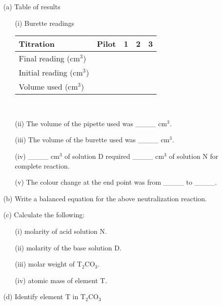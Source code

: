 \begin{enumerate}
\begin{enumerate}
\item[(a)] Table of results\\
\vspace{-10pt}
\begin{enumerate}
\item[(i)] Burette readings\\
\begin{center}
\begin{tabular}{|l|p{2cm}|p{2cm}|p{2cm}|p{2cm}|} \hline
\textbf{Titration}&\multicolumn{1}{|c|}{\textbf{Pilot}}&\multicolumn{1}{|c|}{\textbf{1}}&\multicolumn{1}{|c|}{\textbf{2}}&\multicolumn{1}{|c|}{\textbf{3}}\\ \hline
Final reading (cm$^3$)&&&&\\ \hline
Initial reading (cm$^3$)&&&&\\ \hline
Volume used (cm$^3$)&&&&\\ \hline
\end{tabular}\\
\end{center}
\vspace{4pt}
\item[(ii)] The volume of the pipette used was \_\_\_\_ cm$^3$.
\vspace{2pt}
\item[(iii)] The volume of the burette used was \_\_\_\_ cm$^3$.
\vspace{2pt}
\item[(iv)] \_\_\_\_ cm$^3$ of solution D required \_\_\_\_ cm$^3$ of solution N for complete reaction.\\
\vspace{-8pt}
\item[(v)] The colour change at the end point was from \_\_\_\_ to \_\_\_\_.\\
\end{enumerate}
\vspace{-10pt}
\item[(b)] Write a balanced equation for the above neutralization reaction.\\
\vspace{-8pt}
\item[(c)] Calculate the following:\\
\begin{enumerate}
\vspace{-10pt}
\item[(i)] molarity of acid solution N.
\item[(ii)] molarity of the base solution D.
\item[(iii)] molar weight of T$_2$CO$_3$.
\item[(iv)] atomic mass of element T.
\end{enumerate}
\vspace{2pt}
\item[(d)] Identify element T in T$_2$CO$_3$
\end{enumerate}


\end{enumerate}
